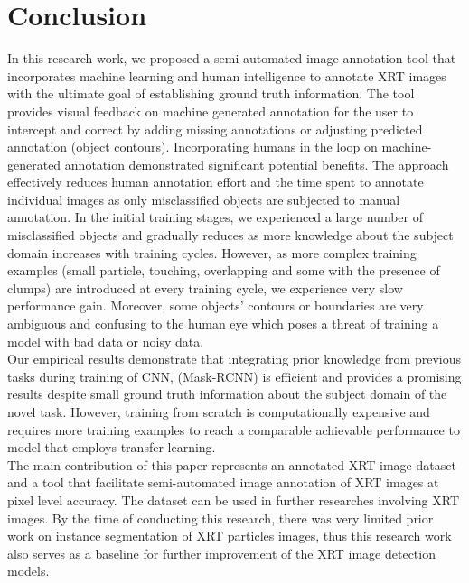\documentclass[conference]{IEEEtran}
\begin{document}
\section{Conclusion}
	
	In this research work, we proposed a semi-automated image annotation tool that incorporates machine learning and human intelligence to annotate XRT images with the ultimate
goal of establishing ground truth information. The tool provides visual feedback on machine generated annotation for the user to intercept and correct by adding missing annotations or
adjusting predicted annotation (object contours). Incorporating humans in the loop on
machine-generated annotation demonstrated significant potential benefits. The approach
effectively reduces human annotation effort and the time spent to annotate individual
images as only misclassified objects are subjected to manual annotation. In the initial
training stages, we experienced a large number of misclassified objects and gradually reduces
as more knowledge about the subject domain increases with training cycles. However,
as more complex training examples (small particle, touching, overlapping and some with
the presence of clumps) are introduced at every training cycle, we experience very slow
performance gain. Moreover, some objects’ contours or boundaries are very ambiguous
and confusing to the human eye which poses a threat of training a model with bad data or
noisy data.\\
	
	Our empirical results demonstrate that integrating prior knowledge from previous tasks
during training of CNN, (Mask-RCNN) is efficient and provides a promising results despite small ground truth information about the subject domain of the novel task. However,
training from scratch is computationally expensive and requires more training examples
to reach a comparable achievable performance to model that employs transfer learning.\\
	
	The main contribution of this paper represents an annotated XRT image dataset
and a tool that facilitate semi-automated image annotation of XRT images at pixel level
accuracy. The dataset can be used in further researches involving XRT images. By the time
of conducting this research, there was very limited prior work on instance segmentation
of XRT particles images, thus this research work also serves as a baseline for further
improvement of the XRT image detection models.\\
	
\end{document}
